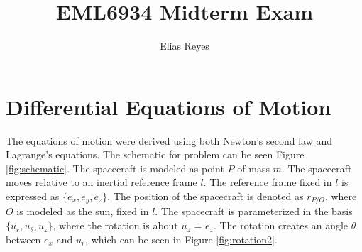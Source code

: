 \documentclass[]{article}
\title{EML6934 Midterm Exam}
\author{Elias Reyes}
\begin{document}
\maketitle



\section{Differential Equations of Motion}
The equations of motion were derived using both Newton's second law and Lagrange's equations. The schematic for problem can be seen Figure \ref{fig:schematic}. The spacecraft is modeled as point \(P\) of  mass \(m\). The spacecraft moves relative to an inertial reference frame \(l\). The reference frame fixed in \(l\) is expressed as \(\{e_{x},e_{y},e_{z}\}\). The position of the spacecraft is denoted as \(r_{P/O}\), where \(O\) is modeled as the sun, fixed in \(l\). The spacecraft is parameterized in the basis \(\{u_{r},u_{\theta},u_{z}\}\), where the rotation is about \(u_{z}\) = \(e_{z}\). The rotation creates an angle \(\theta\) between \(e_{x}\) and \(u_{r}\), which can be seen in Figure \ref{fig:rotation2}.
\end{document}
